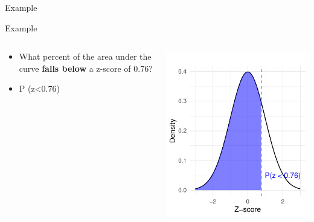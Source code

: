 \documentclass[
  ignorenonframetext,
]{beamer}
\providecommand{\tightlist}{%
  \setlength{\itemsep}{0pt}\setlength{\parskip}{0pt}}
\begin{document}
\begin{frame}{Example}
\label{example}
\end{frame}

\begin{frame}{Example}
\label{example-1}
\begin{columns}[T]
\begin{column}{0.5\textwidth}
\vspace{1cm}

\begin{itemize}
\tightlist
\item
  What percent of the area under the curve \textbf{falls below} a
  z-score of 0.76?
\end{itemize}

\begin{itemize}
\tightlist
\item
  P (z\textless0.76)
\end{itemize}
\end{column}

\begin{column}{0.5\textwidth}
\vspace{1cm}

\includegraphics{M5-Hypothesis-Testing,-Probability-and-Distribution_files/figure-beamer/unnamed-chunk-19-1.pdf}
\end{column}
\end{columns}
\end{frame}
\end{document}
